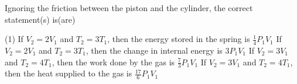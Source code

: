 \item Ignoring the friction between the piston and the cylinder, the correct statement(s) is(are)
        \begin{center}
        \end{center}
        \begin{tasks}(1)
            \task If \( V_2 = 2V_1 \) and \( T_2 = 3T_1 \), then the energy stored in the spring is \( \frac{1}{4} P_1V_1 \)
            \task If \( V_2 = 2V_1 \) and \( T_2 = 3T_1 \), then the change in internal energy is \( 3P_1V_1 \)
            \task If \( V_2 = 3V_1 \) and \( T_2 = 4T_1 \), then the work done by the gas is \( \frac{7}{3} P_1V_1 \)
            \task If \( V_2 = 3V_1 \) and \( T_2 = 4T_1 \), then the heat supplied to the gas is \( \frac{17}{6} P_1V_1 \)
        \end{tasks}